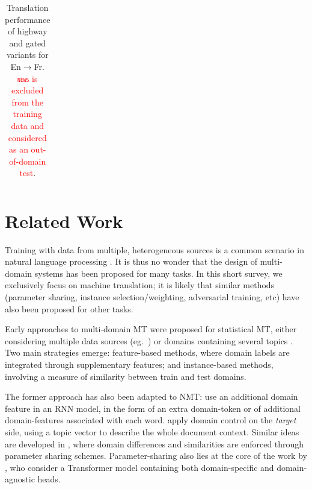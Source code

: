 \documentclass[11pt,a4paper]{article}
\newcommand{\fyTodo}[1]{\Todo[FY:]{\textcolor{orange}{#1}}}
\newcommand{\fyFuture}[1]{\done[FY]\Todo[FY:]{\textcolor{red}{#1}}}
\newcommand{\mpDone}[1]{\done[MP]\Todo[MP:]{\textcolor{green}{#1}}}
\newcommand{\domain}[1]{\texttt{\textsc{#1}}}
\newcommand{\system}[1]{\texttt{\textbf{#1}}}
\newcommand{\revision}[1]{\textcolor{red}{#1}}
\begin{document}
\begin{table}[htbp]
\begin{tabular}{|p{3.5cm}|*{7}{r|}|r|r|}
	\hline
  \end{tabular}
  \caption{Translation performance of highway and gated variants for En$\rightarrow$Fr. \revision{\domain{news} is excluded from the training data and considered as an out-of-domain test}.\fyTodo{Comparison with a regularized version ?}
  }
  \label{tab:performance-random}
\end{table}
\fyFuture{Computation time should also report the time it takes for the complete tuning process, not one iteration which will be more or less the same.}

\section{Related Work \label{sec:related}}
\mpDone{related work}

Training with data from multiple, heterogeneous sources is a common scenario in natural language processing \cite{Dredze08online,Finkel09hierarchical}. It is thus no wonder that the design of multi-domain systems has been proposed for many tasks. In this short survey, we exclusively focus on machine translation; it is likely that similar methods (parameter sharing, instance selection/weighting, adversarial training, etc) have also been proposed for other tasks.

Early approaches to multi-domain MT were proposed for statistical MT, either considering multiple data sources (eg.\ \cite{Banerjee10combining,Clark12onesystem,Sennrich13multidomain,Huck15mixeddomain}) or domains containing several topics \cite{Eidelman12topic,Hasler14dynamic-topic}. Two main strategies emerge: feature-based methods, where domain labels are integrated through supplementary features; and instance-based methods, involving a measure of similarity between train and test domains. 

The former approach has also been adapted to NMT: \citep{Kobus17domaincontrol,Tars18multidomain} use an additional domain feature in an RNN model, in the form of an extra domain-token or of additional domain-features associated with each word. \citet{Chen16guided} apply domain control on the \emph{target} side, using a topic vector to describe the whole document context. Similar ideas are developed in \citep{Chu18multilingual,Pham19generic}, where domain differences and similarities are enforced through parameter sharing schemes. Parameter-sharing also lies at the core of the work by \citet{Jiang19multidomain}, who consider a Transformer model containing both domain-specific and domain-agnostic heads.
\end{document}
